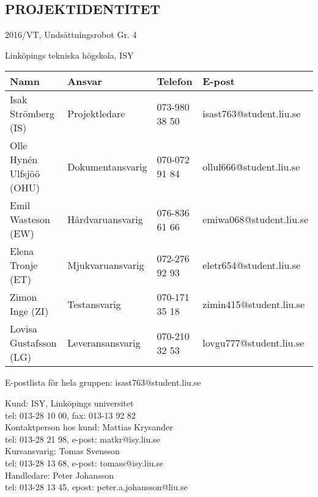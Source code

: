 \documentclass[11pt]{article}
\begin{document}
\pagebreak
\begin{center}

\section*{PROJEKTIDENTITET}
2016/VT, Undsättningsrobot Gr. 4

Linköpings tekniska högskola, ISY
\vspace{5em}
\begin{center}

\begin{tabular}{|l|l|l|l|} \hline
\textbf{Namn} & \textbf{Ansvar} & \textbf{Telefon} & \textbf{E-post}  \\ \hline 
Isak Strömberg (IS) & Projektledare & 073-980 38 50 & isast763@student.liu.se \\ \hline
Olle Hynén Ulfsjöö (OHU)& Dokumentansvarig & 070-072 91 84 & ollul666@student.liu.se \\ \hline
Emil Wasteson (EW) & Hårdvaruansvarig & 076-836 61 66 & emiwa068@student.liu.se \\ \hline
Elena Tronje (ET) & Mjukvaruansvarig & 072-276 92 93 & eletr654@student.liu.se \\ \hline
Zimon Inge (ZI)& Testansvarig & 070-171 35 18 & zimin415@student.liu.se \\ \hline
Lovisa Gustafsson (LG) & Leveransansvarig & 070-210 32 53 & lovgu777@student.liu.se \\ \hline
\end{tabular}

\end{center}

E-postlista för hela gruppen: isast763@student.liu.se

\vspace{5em}
Kund: ISY, Linköpings universitet \\
tel: 013-28 10 00, fax: 013-13 92 82 \\
Kontaktperson hos kund: Mattias Krysander \\
tel: 013-28 21 98, e-post: matkr@isy.liu.se \\

\vspace{5em}
Kursansvarig:  Tomas Svensson\\
tel: 013-28 13 68, e-post: tomass@isy.liu.se \\
Handledare: Peter Johansson \\
tel: 013-28 13 45, epost: peter.a.johansson@liu.se
\end{center}
\pagebreak
\end{document}

